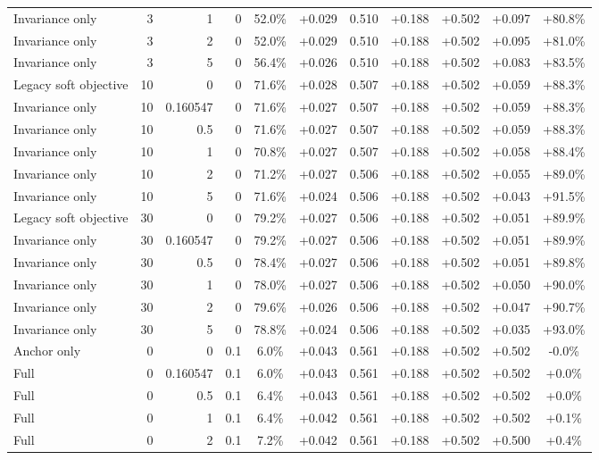 \begin{table}[htbp]
\begin{tabular}{lrrrccccccc}
Invariance only & 3 & 1 & 0 & 52.0\% & +0.029 & 0.510 & +0.188 & +0.502 & +0.097 & +80.8\% \\
Invariance only & 3 & 2 & 0 & 52.0\% & +0.029 & 0.510 & +0.188 & +0.502 & +0.095 & +81.0\% \\
Invariance only & 3 & 5 & 0 & 56.4\% & +0.026 & 0.510 & +0.188 & +0.502 & +0.083 & +83.5\% \\
Legacy soft objective & 10 & 0 & 0 & 71.6\% & +0.028 & 0.507 & +0.188 & +0.502 & +0.059 & +88.3\% \\
Invariance only & 10 & 0.160547 & 0 & 71.6\% & +0.027 & 0.507 & +0.188 & +0.502 & +0.059 & +88.3\% \\
Invariance only & 10 & 0.5 & 0 & 71.6\% & +0.027 & 0.507 & +0.188 & +0.502 & +0.059 & +88.3\% \\
Invariance only & 10 & 1 & 0 & 70.8\% & +0.027 & 0.507 & +0.188 & +0.502 & +0.058 & +88.4\% \\
Invariance only & 10 & 2 & 0 & 71.2\% & +0.027 & 0.506 & +0.188 & +0.502 & +0.055 & +89.0\% \\
Invariance only & 10 & 5 & 0 & 71.6\% & +0.024 & 0.506 & +0.188 & +0.502 & +0.043 & +91.5\% \\
Legacy soft objective & 30 & 0 & 0 & 79.2\% & +0.027 & 0.506 & +0.188 & +0.502 & +0.051 & +89.9\% \\
Invariance only & 30 & 0.160547 & 0 & 79.2\% & +0.027 & 0.506 & +0.188 & +0.502 & +0.051 & +89.9\% \\
Invariance only & 30 & 0.5 & 0 & 78.4\% & +0.027 & 0.506 & +0.188 & +0.502 & +0.051 & +89.8\% \\
Invariance only & 30 & 1 & 0 & 78.0\% & +0.027 & 0.506 & +0.188 & +0.502 & +0.050 & +90.0\% \\
Invariance only & 30 & 2 & 0 & 79.6\% & +0.026 & 0.506 & +0.188 & +0.502 & +0.047 & +90.7\% \\
Invariance only & 30 & 5 & 0 & 78.8\% & +0.024 & 0.506 & +0.188 & +0.502 & +0.035 & +93.0\% \\
Anchor only & 0 & 0 & 0.1 & 6.0\% & +0.043 & 0.561 & +0.188 & +0.502 & +0.502 & -0.0\% \\
Full & 0 & 0.160547 & 0.1 & 6.0\% & +0.043 & 0.561 & +0.188 & +0.502 & +0.502 & +0.0\% \\
Full & 0 & 0.5 & 0.1 & 6.4\% & +0.043 & 0.561 & +0.188 & +0.502 & +0.502 & +0.0\% \\
Full & 0 & 1 & 0.1 & 6.4\% & +0.042 & 0.561 & +0.188 & +0.502 & +0.502 & +0.1\% \\
Full & 0 & 2 & 0.1 & 7.2\% & +0.042 & 0.561 & +0.188 & +0.502 & +0.500 & +0.4\% \\

\end{tabular}
\end{table}
